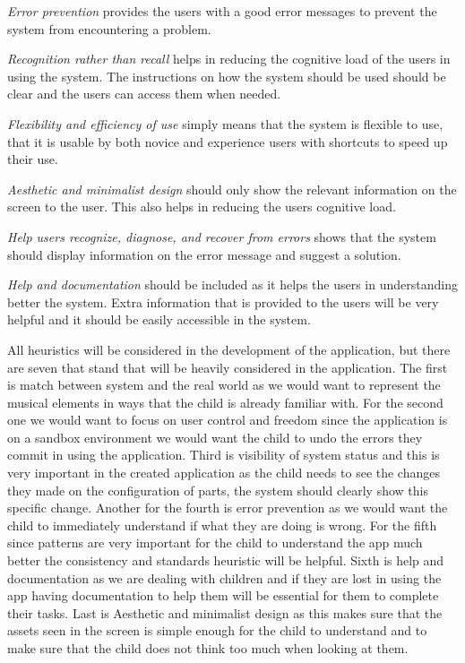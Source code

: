 \textit{Error prevention} provides the users with a good error messages to prevent the system from encountering a problem. 

\textit{Recognition rather than recall} helps in reducing the cognitive load of the users in using the system. The instructions on how the system should be used should be clear and the users can access them when needed.
 
\textit{Flexibility and efficiency of use} simply means that the system is flexible to use, that it is usable by both novice and experience users with shortcuts to speed up their use.

\textit{Aesthetic and minimalist design} should only show the relevant information on the screen to the user. This also helps in reducing the users cognitive load.

\textit{Help users recognize, diagnose, and recover from errors} shows that the system should display information on the error message and suggest a solution.

\textit{Help and documentation} should be included as it helps the users in understanding better the system. Extra information that is provided to the users will be very helpful and it should be easily accessible in the system.

All heuristics will be considered in the development of the application, but there are seven that stand that will be heavily considered in the application. The first is match  between  system  and  the  real  world as we would want to represent the musical elements in ways that the child is already familiar with. For the second one we would want to focus on user control and freedom since the application is on a sandbox environment we would want the child to undo the errors they commit in using the application. Third is visibility of system status and this is very important in the created application as the child needs to see the changes they made on the configuration of parts, the system should clearly show this specific change. Another for the fourth is error prevention as we would want the child to immediately understand if what they are doing is wrong. For the fifth since patterns are very important for the child to understand the app much better the consistency and standards heuristic will be helpful. Sixth is help and documentation as we are dealing with children and if they are lost in using the app having documentation to help them will be essential for them to complete their tasks. Last is Aesthetic and minimalist design as this makes sure that the assets seen in the screen is simple enough for the child to understand and to make sure that the child does not think too much when looking at them. 

